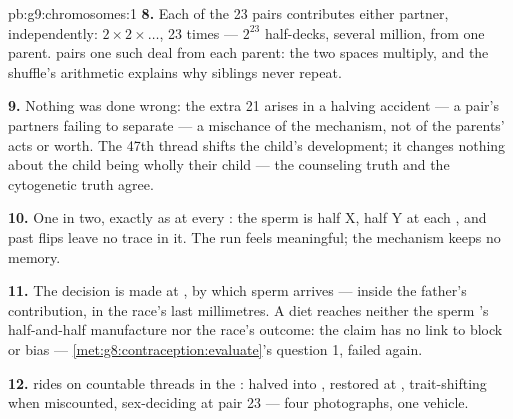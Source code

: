 \begin{solution}{pb:g9:chromosomes:1}
\textbf{8.} Each of the 23 pairs contributes either
partner, independently: $2 \times 2 \times \dots$, 23
times --- $2^{23}$ half-decks, several million, from one
parent.  pairs one such deal from each
parent: the two spaces multiply, and the shuffle's
arithmetic explains why siblings never repeat.

\textbf{9.} Nothing was done wrong: the extra 21 arises
in a halving accident --- a pair's partners failing to
separate --- a mischance of the mechanism, not of the
parents' acts or worth. The 47th thread shifts the
child's development; it changes nothing about the child
being wholly their child --- the counseling truth and
the cytogenetic truth agree.

\textbf{10.} One in two, exactly as at every : the
sperm  is half X, half Y at each ,
and past flips leave no trace in it. The run feels
meaningful; the mechanism keeps no memory.

\textbf{11.} The decision is made at , by
which sperm arrives --- inside the father's contribution,
in the race's last millimetres. A diet reaches neither
the sperm 's half-and-half manufacture nor the
race's outcome: the claim has no link to block or bias
--- \cref{met:g8:contraception:evaluate}'s question 1,
failed again.

\textbf{12.}  rides on countable threads in the
: halved into , restored at ,
trait-shifting when miscounted, sex-deciding at pair 23
--- four photographs, one vehicle.
\end{solution}
